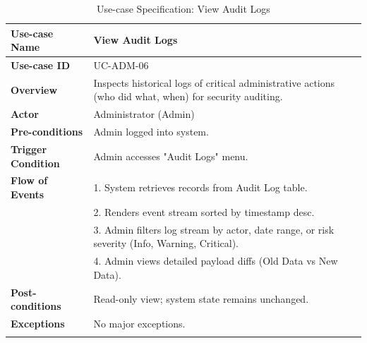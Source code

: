 \newpage
\begin{longtable}{|p{3.5cm}|p{11.5cm}|}
    \hline
    \textbf{Use-case Name} & \textbf{View Audit Logs} \\
    \hline
    \textbf{Use-case ID} & UC-ADM-06 \\
    \hline
    \textbf{Overview} & Inspects historical logs of critical administrative actions (who did what, when) for security auditing. \\
    \hline
    \textbf{Actor} & Administrator (Admin) \\
    \hline
    \textbf{Pre-conditions} & Admin logged into system. \\
    \hline
    \textbf{Trigger Condition} & Admin accesses "Audit Logs" menu. \\
    \hline
    \textbf{Flow of Events} & 
    1. System retrieves records from Audit Log table.\\ 
 & 
    2. Renders event stream sorted by timestamp desc.\\ 
 & 
    3. Admin filters log stream by actor, date range, or risk severity (Info, Warning, Critical).\\ 
 & 
    4. Admin views detailed payload diffs (Old Data vs New Data). \\
    \hline
    \textbf{Post-conditions} & Read-only view; system state remains unchanged. \\
    \hline
    \textbf{Exceptions} & No major exceptions. \\
    \hline
    \caption{Use-case Specification: View Audit Logs} \\
\end{longtable}

